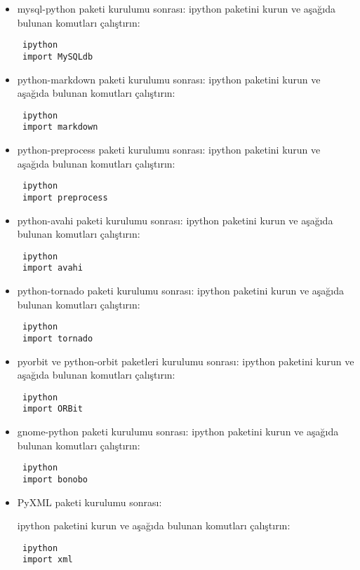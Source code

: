 \documentclass[a4paper,10pt]{article}
\begin{document}
\begin{itemize}
\item mysql-python paketi kurulumu sonrası:
ipython paketini kurun ve aşağıda bulunan komutları çalıştırın:
\begin{verbatim}
 ipython
 import MySQLdb
\end{verbatim}

\item python-markdown paketi kurulumu sonrası:
ipython paketini kurun ve aşağıda bulunan komutları çalıştırın:
\begin{verbatim}
 ipython
 import markdown
\end{verbatim}

\item python-preprocess paketi kurulumu sonrası:
ipython paketini kurun ve aşağıda bulunan komutları çalıştırın:
\begin{verbatim}
 ipython
 import preprocess
\end{verbatim}

\item python-avahi paketi kurulumu sonrası:
ipython paketini kurun ve aşağıda bulunan komutları çalıştırın:
\begin{verbatim}
 ipython
 import avahi
\end{verbatim}

\item python-tornado paketi kurulumu sonrası:
ipython paketini kurun ve aşağıda bulunan komutları çalıştırın:
\begin{verbatim}
 ipython
 import tornado
\end{verbatim}

\item pyorbit ve python-orbit paketleri kurulumu sonrası:
ipython paketini kurun ve aşağıda bulunan komutları çalıştırın:
\begin{verbatim}
 ipython
 import ORBit
\end{verbatim}

\item gnome-python paketi kurulumu sonrası:
ipython paketini kurun ve aşağıda bulunan komutları çalıştırın:
\begin{verbatim}
 ipython
 import bonobo
\end{verbatim}


\item PyXML paketi kurulumu sonrası:

ipython paketini kurun ve aşağıda bulunan komutları çalıştırın:
\begin{verbatim}
 ipython
 import xml
\end{verbatim}


\end{itemize}
\end{document}
